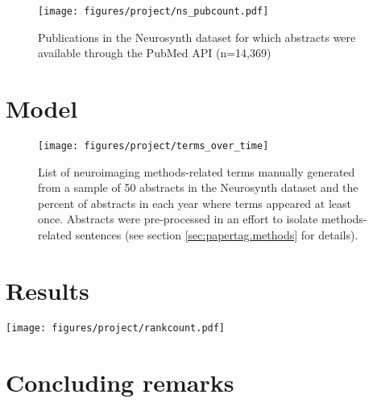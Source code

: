 \begin{figure}[!tp]
	\centering
	\texttt{[image: figures/project/ns\_pubcount.pdf]}
	\caption{Publications in the Neurosynth dataset for which abstracts were available through the PubMed API (n=14,369)}
	\label{fig:papertag.pubcounts}
	\end{figure}


\section{Model}
\label{sec:papertag.model}


\begin{figure}[tp!]
	\centering
	\texttt{[image: figures/project/terms\_over\_time]}
	\caption{List of neuroimaging methods-related terms manually generated from a sample of 50 abstracts in the Neurosynth dataset and the percent of abstracts in each year where terms appeared at least once. Abstracts were pre-processed in an effort to isolate methods-related sentences (see section \ref{sec:papertag.methods} for details).}
	\label{fig:papertag.corpus}
\end{figure}

\section{Results}
\label{sec:papertag.results}


\begin{figure*}[]
	\centering	
	\texttt{[image: figures/project/rankcount.pdf]}  
	\caption{Rank-count distribution for methods-related corpus extracted using the list of words shown in Figure \ref{fig:papertag.corpus}. The 10 most commonly-used terms, the least common term, and a random selection of ``middle'' terms are labeled. Parts of speech were assigned for purposes of dataset exploration using NLTK's \texttt{pos\_tag} function \cite{BirdEtAl2009}.}
	\label{fig:papertag.rankcount}
\end{figure*}


\section{Concluding remarks}
\label{sec:papertag.concludingremarks}



